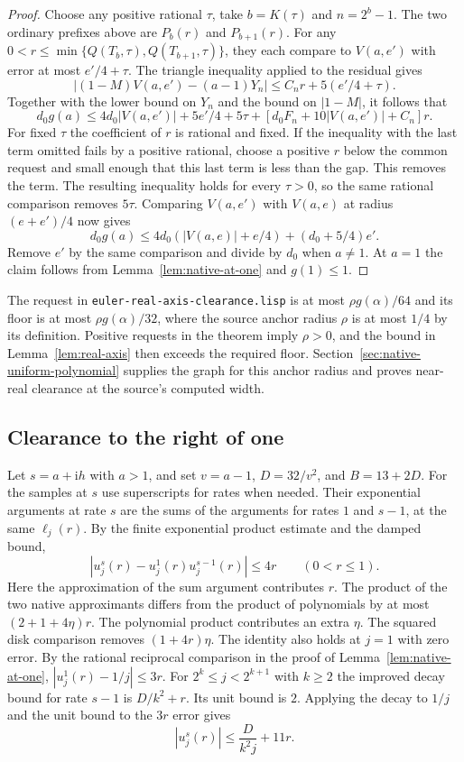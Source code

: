 \documentclass[11pt]{amsart}
\theoremstyle{definition}
\theoremstyle{remark}
\numberwithin{equation}{section}
\newcommand{\code}[1]{\nolinkurl{#1}}
\begin{document}
\begin{proof}
Choose any positive rational $\tau$, take $b=K(\tau)$ and
$n=2^b-1$. The two ordinary prefixes above are $P_b(r)$ and
$P_{b+1}(r)$. For any
$0<r\le\min\{Q(T_b,\tau),Q(T_{b+1},\tau)\}$,
they each compare to $V(a,e')$ with error at most $e'/4+\tau$.
The triangle inequality applied to the residual gives
\[
 |(1-M)V(a,e')-(a-1)Y_n|\le C_n r+5(e'/4+\tau).
\]
Together with the lower bound on $Y_n$ and the bound on
$|1-M|$, it follows that
\[
 d_0g(a)\le
  4d_0|V(a,e')|+5e'/4+5\tau+
  [d_0F_n+10|V(a,e')|+C_n]r .
\]
For fixed $\tau$ the coefficient of $r$ is rational and fixed.
If the inequality with the last term omitted fails by a
positive rational, choose a positive $r$ below the common
request and small enough that this last term is less than
the gap. This removes the term. The resulting inequality
holds for every $\tau>0$, so the same rational comparison
removes $5\tau$. Comparing $V(a,e')$ with $V(a,e)$ at
radius $(e+e')/4$ now gives
\[
 d_0g(a)\le 4d_0(|V(a,e)|+e/4)+(d_0+5/4)e'.
\]
Remove $e'$ by the same comparison and divide by $d_0$
when $a\ne1$. At $a=1$ the claim follows from
Lemma~\ref{lem:native-at-one} and $g(1)\le1$.
\end{proof}

The request in \code{euler-real-axis-clearance.lisp} is at most
$\rho g(\alpha)/64$ and its floor
is at most $\rho g(\alpha)/32$, where the source anchor
radius $\rho$ is at most $1/4$ by its definition. Positive
requests in the theorem imply $\rho>0$, and the bound in
Lemma~\ref{lem:real-axis} then exceeds the required floor.
Section~\ref{sec:native-uniform-polynomial} supplies the graph
for this anchor radius and proves near-real clearance at the
source's computed width.

\subsection{Clearance to the right of one}
\label{sec:right-clearance}

Let $s=a+\mathrm i h$ with $a>1$, and set $v=a-1$,
$D=32/v^2$, and $B=13+2D$. For the samples at $s$ use
superscripts for rates when needed. Their exponential arguments
at rate $s$ are the sums of the arguments for rates $1$ and
$s-1$, at the same $\ell_j(r)$.
By the finite exponential product estimate and the damped bound,
\[
 |u_j^{s}(r)-u_j^{1}(r)u_j^{s-1}(r)|\le4r \qquad(0<r\le1).
\]
Here the approximation of the sum argument contributes $r$.
The product of the two native approximants differs from the
product of polynomials by at most $(2+1+4\eta)r$. The
polynomial product contributes an extra $\eta$. The squared
disk comparison removes $(1+4r)\eta$. The identity also holds
at $j=1$ with zero error.
By the rational reciprocal comparison in the proof of
Lemma~\ref{lem:native-at-one}, $|u_j^1(r)-1/j|\le3r$.
For $2^k\le j<2^{k+1}$ with $k\ge2$ the improved decay
bound for rate $s-1$ is $D/k^2+r$. Its unit bound is $2$.
Applying the decay to $1/j$ and the unit bound to the
$3r$ error gives
\begin{equation}\label{eq:normalized-node-tail}
   |u_j^s(r)|\le \frac{D}{k^2 j}+11r .
\end{equation}
\end{document}
